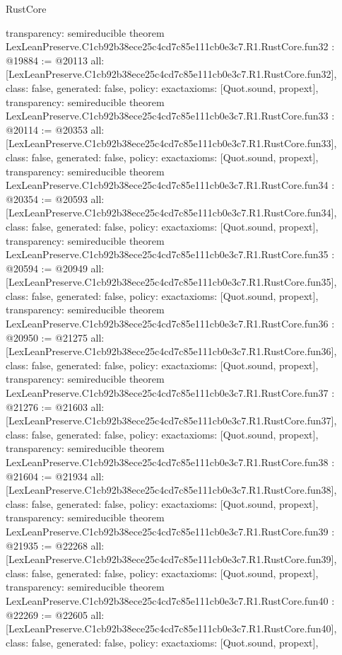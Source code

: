\begin{lexlean}{RustCore}
\begin{coremodule}
{  transparency: semireducible
}
theorem LexLeanPreserve.C1cb92b38ece25c4cd7c85e111cb0e3c7.R1.RustCore.fun32 : @19884 := @20113 {
  all: [LexLeanPreserve.C1cb92b38ece25c4cd7c85e111cb0e3c7.R1.RustCore.fun32],
  class: false,
  generated: false,
  policy: exact{axioms: [Quot.sound, propext]},
  transparency: semireducible
}
theorem LexLeanPreserve.C1cb92b38ece25c4cd7c85e111cb0e3c7.R1.RustCore.fun33 : @20114 := @20353 {
  all: [LexLeanPreserve.C1cb92b38ece25c4cd7c85e111cb0e3c7.R1.RustCore.fun33],
  class: false,
  generated: false,
  policy: exact{axioms: [Quot.sound, propext]},
  transparency: semireducible
}
theorem LexLeanPreserve.C1cb92b38ece25c4cd7c85e111cb0e3c7.R1.RustCore.fun34 : @20354 := @20593 {
  all: [LexLeanPreserve.C1cb92b38ece25c4cd7c85e111cb0e3c7.R1.RustCore.fun34],
  class: false,
  generated: false,
  policy: exact{axioms: [Quot.sound, propext]},
  transparency: semireducible
}
theorem LexLeanPreserve.C1cb92b38ece25c4cd7c85e111cb0e3c7.R1.RustCore.fun35 : @20594 := @20949 {
  all: [LexLeanPreserve.C1cb92b38ece25c4cd7c85e111cb0e3c7.R1.RustCore.fun35],
  class: false,
  generated: false,
  policy: exact{axioms: [Quot.sound, propext]},
  transparency: semireducible
}
theorem LexLeanPreserve.C1cb92b38ece25c4cd7c85e111cb0e3c7.R1.RustCore.fun36 : @20950 := @21275 {
  all: [LexLeanPreserve.C1cb92b38ece25c4cd7c85e111cb0e3c7.R1.RustCore.fun36],
  class: false,
  generated: false,
  policy: exact{axioms: [Quot.sound, propext]},
  transparency: semireducible
}
theorem LexLeanPreserve.C1cb92b38ece25c4cd7c85e111cb0e3c7.R1.RustCore.fun37 : @21276 := @21603 {
  all: [LexLeanPreserve.C1cb92b38ece25c4cd7c85e111cb0e3c7.R1.RustCore.fun37],
  class: false,
  generated: false,
  policy: exact{axioms: [Quot.sound, propext]},
  transparency: semireducible
}
theorem LexLeanPreserve.C1cb92b38ece25c4cd7c85e111cb0e3c7.R1.RustCore.fun38 : @21604 := @21934 {
  all: [LexLeanPreserve.C1cb92b38ece25c4cd7c85e111cb0e3c7.R1.RustCore.fun38],
  class: false,
  generated: false,
  policy: exact{axioms: [Quot.sound, propext]},
  transparency: semireducible
}
theorem LexLeanPreserve.C1cb92b38ece25c4cd7c85e111cb0e3c7.R1.RustCore.fun39 : @21935 := @22268 {
  all: [LexLeanPreserve.C1cb92b38ece25c4cd7c85e111cb0e3c7.R1.RustCore.fun39],
  class: false,
  generated: false,
  policy: exact{axioms: [Quot.sound, propext]},
  transparency: semireducible
}
theorem LexLeanPreserve.C1cb92b38ece25c4cd7c85e111cb0e3c7.R1.RustCore.fun40 : @22269 := @22605 {
  all: [LexLeanPreserve.C1cb92b38ece25c4cd7c85e111cb0e3c7.R1.RustCore.fun40],
  class: false,
  generated: false,
  policy: exact{axioms: [Quot.sound, propext]},
}
\end{coremodule}
\end{lexlean}
